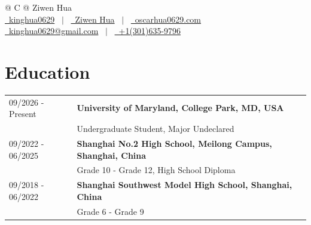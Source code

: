 \documentclass[a4paper,12pt]{article}
\begin{document}
\pagestyle{empty}



\begin{tabularx}{\linewidth}{@{} C @{}}
    \Huge{Ziwen Hua}                                                                    \\[7.5pt]
    \href{https://github.com/kinghua0629}{\raisebox{-0.05\height}\faGithub\ kinghua0629} \ $|$ \
    \href{https://linkedin.com/in/ziwen-hua-625a6a3b4}{\raisebox{-0.05\height}\faLinkedin\ Ziwen Hua} \ $|$ \
    \href{https://oscarhua0629.com}{\raisebox{-0.05\height}\faGlobe \ oscarhua0629.com} \\
    \href{mailto:kinghua0629@gmail.com}{\raisebox{-0.05\height}\faEnvelope \ kinghua0629@gmail.com} \ $|$ \
    \href{tel:+1(301)635-9796}{\raisebox{-0.05\height}\faMobile \ +1(301)635-9796}      \\
\end{tabularx}

\section{Education}
\begin{tabularx}{\linewidth}{@{}l X@{}}
    09/2026 - Present & \textbf{University of Maryland, College Park, MD, USA}              \\ & Undergraduate Student, Major Undeclared \\
    09/2022 - 06/2025 & \textbf{Shanghai No.2 High School, Meilong Campus, Shanghai, China} \\ & Grade 10 - Grade 12, High School Diploma \\
    09/2018 - 06/2022 & \textbf{Shanghai Southwest Model High School, Shanghai, China }     \\ & Grade 6 - Grade 9 \\
\end{tabularx}
\end{document}
